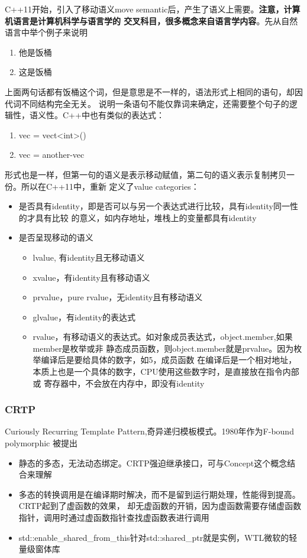 C++11开始，引入了移动语义move semantic后，产生了语义上需要。\textbf{注意，计算机语言是计算机科学与语言学的
交叉科目，很多概念来自语言学内容}。先从自然语言中举个例子来说明
\begin{enumerate}
    \item {他是饭桶}
    \item {这是饭桶}
\end{enumerate}
上面两句话都有饭桶这个词，但是意思是不一样的，语法形式上相同的语句，却因代词不同结构完全无关。
说明一条语句不能仅靠词来确定，还需要整个句子的逻辑性，语义性。C++中也有类似的表达式：
\begin{enumerate}
    \item {vec = vect<int>()}
    \item {vec = another-vec}
\end{enumerate}
形式也是一样，但第一句的语义是表示移动赋值，第二句的语义表示复制拷贝一份。所以在C++11中，重新
定义了value categories：
\begin{itemize}
    \item {是否具有identity，即是否可以与另一个表达式进行比较，具有identity同一性的才具有比较
    的意义，如内存地址，堆栈上的变量都具有identity}
    \item {是否呈现移动的语义}
    \begin{itemize}
        \item {lvalue, 有identity且无移动语义}
        \item {xvalue，有identity且有移动语义}
        \item {prvalue，pure rvalue，无identity且有移动语义}
        \item {glvalue，有identity的表达式}
        \item {rvalue，有移动语义的表达式。如对象成员表达式，object.member,如果member是枚举或非
        静态成员函数，则object.member就是prvalue。因为枚举编译后是要给具体的数字，如5，成员函数
        在编译后是一个相对地址，本质上也是一个具体的数字，CPU使用这些数字时，是直接放在指令内部或
        寄存器中，不会放在内存中，即没有identity}
    \end{itemize}
\end{itemize}

\subsubsection{CRTP}
Curiously Recurring Template Pattern,奇异递归模板模式。1980年作为F-bound polymorphic
被提出
\begin{itemize}
    \item {静态的多态，无法动态绑定。CRTP强迫继承接口，可与Concept这个概念结合来理解}
    \item {多态的转换调用是在编译期时解决，而不是留到运行期处理，性能得到提高。CRTP起到了虚函数的效果，
    却无虚函数的开销，因为虚函数需要存储虚函数指针，调用时通过虚函数指针查找虚函数表进行调用}
    \item {std::enable\_shared\_from\_this针对std::shared\_ptr就是实例，WTL微软的轻量级窗体库}
\end{itemize}

